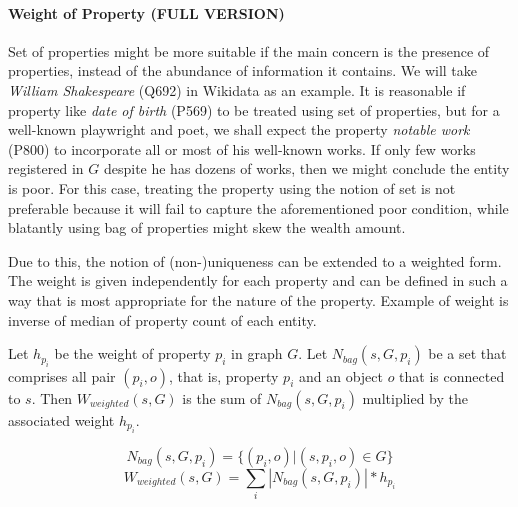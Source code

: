 \paragraph{Weight of Property (FULL VERSION)}


Set of properties might be more suitable if the main concern is the presence of properties, instead of the abundance of information it contains. We will take \textit{William Shakespeare} (Q692) in Wikidata as an example. It is reasonable if property like  \textit{date of birth} (P569) to be treated using set of properties, but for a well-known playwright and poet, we shall expect the property \textit{notable work} (P800) to incorporate all or most of his well-known works. If only few works registered in \(G\) despite he has dozens of works, then we might conclude the entity is poor. For this case, treating the property using the notion of set is not preferable because it will fail to capture the aforementioned poor condition, while blatantly using bag of properties might skew the wealth amount.

Due to this, the notion of (non-)uniqueness can be extended to a weighted form. The weight is given independently for each property and can be defined in such a way that is most appropriate for the nature of the property. Example of weight is inverse of median of property count of each entity.

Let \(h_{p_i}\) be the weight of property \(p_i\) in graph \(G\). Let \(N_{bag}(s,G,p_i)\) be a set that comprises all pair  \((p_i,o)\), that is, property \(p_i\) and an object \(o\) that is connected to \(s\). Then \(W_{weighted}(s, G)\) is the sum of \(N_{bag}(s,G,p_i)\) multiplied by the associated weight \(h_{p_i}\).


\[
    N_{bag}(s,G,p_i) = \{(p_i, o) | (s, p_i, o) \in G\}
\]
\[
    W_{weighted}(s, G) = \sum_i |N_{bag}(s,G,p_i)| * h_{p_i}
\]

